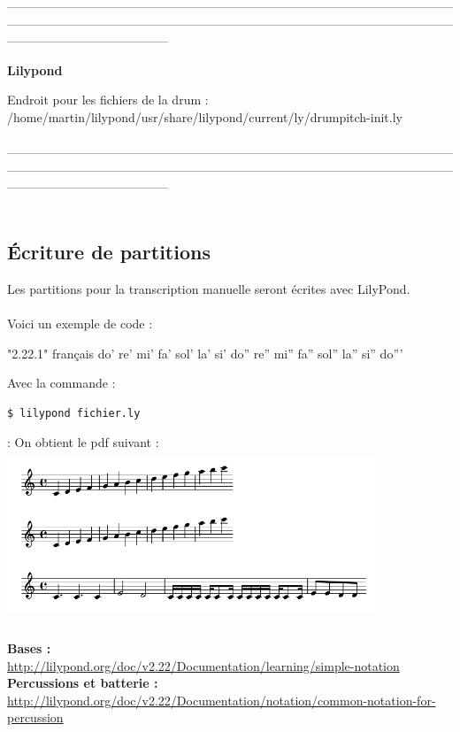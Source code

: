 —————————————————————————————————————————————————————————————————————————————————————\\
\begin{center}
	\textbf{\LARGE{Lilypond}}
\end{center}
Endroit pour les fichiers de la drum :\\
/home/martin/lilypond/usr/share/lilypond/current/ly/drumpitch-init.ly\\\\
—————————————————————————————————————————————————————————————————————————————————————\\\\
\subsection{Écriture de partitions}
Les partitions pour la transcription manuelle seront écrites avec LilyPond.\\\\
Voici un exemple de code :
\begin{verbatimtab}
	\version "2.22.1"
	\language français
	{
		do' re' mi' fa' sol' la' si' do'' re'' mi'' fa'' sol'' la'' si'' do'''
	}
\end{verbatimtab}
Avec la commande :\begin{verbatim}$ lilypond fichier.ly\end{verbatim}:
On obtient le pdf suivant :\\
\includegraphics[height=50mm, width=110mm]{images/lilypond_0.png}\\\\
\textbf{Bases :}\\
\url{http://lilypond.org/doc/v2.22/Documentation/learning/simple-notation}\\

\textbf{Percussions et batterie :}\\
\url{http://lilypond.org/doc/v2.22/Documentation/notation/common-notation-for-percussion}

